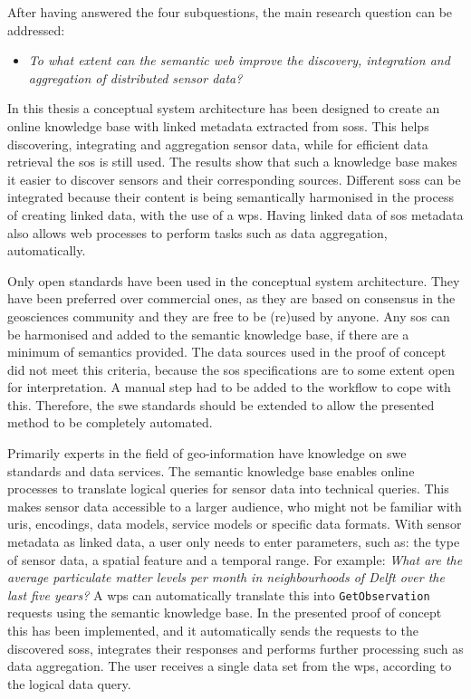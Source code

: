 After having answered the four subquestions, the main research question can be addressed:

\begin{itemize}
	\item \textit{To what extent can the semantic web improve the discovery, integration and aggregation of distributed sensor data?}
\end{itemize}

In this thesis a conceptual system architecture has been designed to create an online knowledge base with linked metadata extracted from \aclp{sos}. This helps discovering, integrating and aggregation sensor data, while for efficient data retrieval the \ac{sos} is still used. The results show that such a knowledge base makes it easier to discover sensors and their corresponding sources. Different \aclp{sos} can be integrated because their content is being semantically harmonised in the process of creating linked data, with the use of a \ac{wps}. Having linked data of \ac{sos} metadata also allows web processes to perform tasks such as data aggregation, automatically.

Only open standards have been used in the conceptual system architecture. They have been preferred over commercial ones, as they are based on consensus in the geosciences community and they are free to be (re)used by anyone. Any \ac{sos} can be harmonised and added to the semantic knowledge base, if there are a minimum of semantics provided. The data sources used in the proof of concept did not meet this criteria, because the \ac{sos} specifications are to some extent open for interpretation. A manual step had to be added to the workflow to cope with this. Therefore, the \ac{swe} standards should be extended to allow the presented method to be completely automated. 

Primarily experts in the field of geo-information have knowledge on \ac{swe} standards and data services. The semantic knowledge base enables online processes to translate logical queries for sensor data into technical queries. This makes sensor data accessible to a larger audience, who might not be familiar with \acp{uri}, encodings, data models, service models or specific data formats. With sensor metadata as linked data, a user only needs to enter parameters, such as: the type of sensor data, a spatial feature and a temporal range. For example: \textit{What are the average particulate matter levels per month in neighbourhoods of Delft over the last five years?} A \ac{wps} can automatically translate this into \texttt{GetObservation} requests using the semantic knowledge base. In the presented proof of concept this has been implemented, and it automatically sends the requests to the discovered \aclp{sos}, integrates their responses and performs further processing such as data aggregation. The user receives a single data set from the \ac{wps}, according to the logical data query.   


